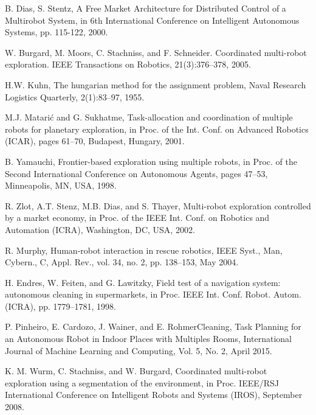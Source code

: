 \documentclass[letterpaper, 10 pt, conference]{ieeeconf}  %
\begin{document}


\begin{thebibliography}{99}

 B. Dias, S. Stentz, A Free Market Architecture for Distributed Control of a Multirobot System, in 6th International Conference on Intelligent Autonomous Systems, pp. 115-122, 2000.

 W. Burgard, M. Moors, C. Stachniss, and F. Schneider. Coordinated multi-robot exploration. IEEE Transactions on Robotics, 21(3):376–378, 2005.

 H.W. Kuhn, The hungarian method for the assignment problem, Naval Research Logistics Quarterly, 2(1):83–97, 1955.

 M.J. Matarić and G. Sukhatme, Task-allocation and coordination of
multiple robots for planetary exploration, in Proc. of the Int. Conf. on Advanced Robotics (ICAR), pages 61–70, Budapest, Hungary, 2001.

 B. Yamauchi, Frontier-based exploration using multiple robots, in
Proc. of the Second International Conference on Autonomous Agents, pages 47–53, Minneapolis, MN, USA, 1998.

 R. Zlot, A.T. Stenz, M.B. Dias, and S. Thayer, Multi-robot exploration controlled by a market economy, in Proc. of the IEEE Int. Conf. on Robotics and Automation (ICRA), Washington, DC, USA, 2002.

 R. Murphy, Human-robot interaction in rescue robotics, IEEE Syst., Man, Cybern., C, Appl. Rev., vol. 34, no. 2, pp. 138–153, May 2004.

 H. Endres, W. Feiten, and G. Lawitzky, Field test of a navigation system: autonomous cleaning in supermarkets, in Proc. IEEE Int. Conf. Robot. Autom. (ICRA), pp. 1779–1781, 1998.

 P. Pinheiro, E. Cardozo, J. Wainer, and E. RohmerCleaning, Task Planning for an Autonomous Robot in Indoor Places with Multiples Rooms, International Journal of Machine Learning and Computing, Vol. 5, No. 2, April 2015.

 K. M. Wurm, C. Stachniss, and W. Burgard, Coordinated multi-robot exploration using a segmentation of the environment, in Proc. IEEE/RSJ  International Conference on Intelligent Robots and Systems (IROS), September 2008.


\end{thebibliography}
\end{document}
